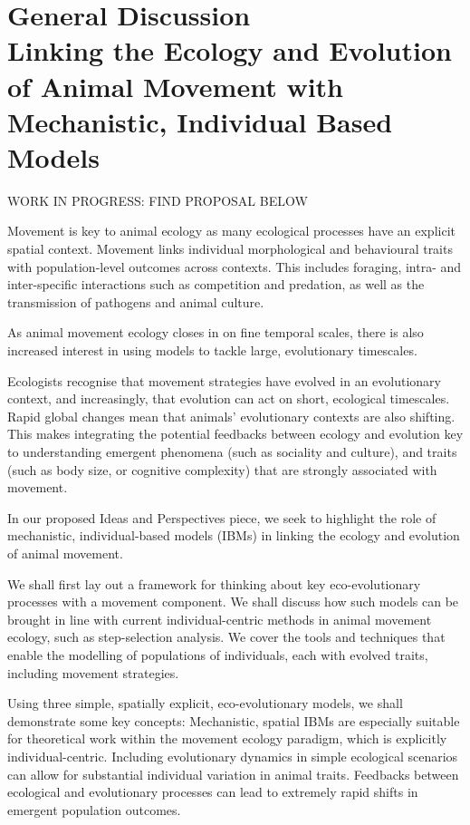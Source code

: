 
\chapter{{\color{gray}General Discussion}\\Linking the Ecology and Evolution of Animal Movement with Mechanistic, Individual Based Models}

{}

{\color{red}WORK IN PROGRESS: FIND PROPOSAL BELOW}

Movement is key to animal ecology as many ecological processes have an explicit spatial context. Movement links individual morphological and behavioural traits with population-level outcomes across contexts. This includes foraging, intra- and inter-specific interactions such as competition and predation, as well as the transmission of pathogens and animal culture. 

As animal movement ecology closes in on fine temporal scales, there is also increased interest in using models to tackle large, evolutionary timescales.

Ecologists recognise that movement strategies have evolved in an evolutionary context, and increasingly, that evolution can act on short, ecological timescales. Rapid global changes mean that animals’ evolutionary contexts are also shifting. This makes integrating the potential feedbacks between ecology and evolution key to understanding emergent phenomena (such as sociality and culture), and traits (such as body size, or cognitive complexity) that are strongly associated with movement.

In our proposed Ideas and Perspectives piece, we seek to highlight the role of mechanistic, individual-based models (IBMs) in linking the ecology and evolution of animal movement. 

We shall first lay out a framework for thinking about key eco-evolutionary processes with a movement component. We shall discuss how such models can be brought in line with current individual-centric methods in animal movement ecology, such as step-selection analysis. We cover the tools and techniques that enable the modelling of populations of individuals, each with evolved traits, including movement strategies. 

Using three simple, spatially explicit, eco-evolutionary models, we shall demonstrate some key concepts:
Mechanistic, spatial IBMs are especially suitable for theoretical work within the movement ecology paradigm, which is explicitly individual-centric.
Including evolutionary dynamics in simple ecological scenarios can allow for substantial individual variation in animal traits.
Feedbacks between ecological and evolutionary processes can lead to extremely rapid shifts in emergent population outcomes.
